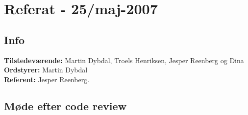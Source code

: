 \documentclass[a4paper,10pt,draft]{article}
\begin{document}
\section{Referat - 25/maj-2007}

\subsection{Info}

\textbf{Tilstedeværende:} Martin Dybdal, Troels Henriksen, Jesper Reenberg og Dina\\
\textbf{Ordstyrer:} Martin Dybdal\\
\textbf{Referent:} Jesper Reenberg.

\subsection{Møde efter code review}
\end{document}
